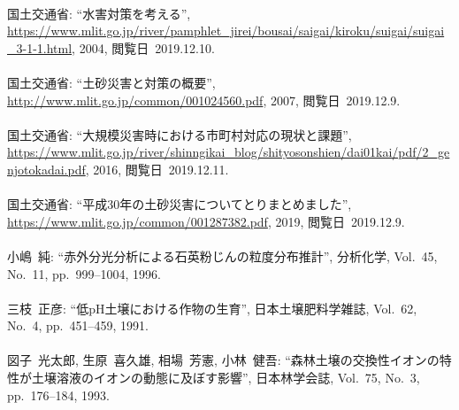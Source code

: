 \begin{mythebibliography}{}
\leavevmode \\国土交通省:
\newblock ``水害対策を考える'', 
\newblock \url{https://www.mlit.go.jp/river/pamphlet_jirei/bousai/saigai/kiroku/suigai/suigai_3-1-1.html}, 2004, 
\newblock \mbox{閲覧日 2019.12.10}.
\\

\leavevmode \\国土交通省:
\newblock ``土砂災害と対策の概要'', \\
\newblock \url{http://www.mlit.go.jp/common/001024560.pdf}, 2007, 
\newblock \mbox{閲覧日 2019.12.9}.
\\

\leavevmode \\国土交通省:
\newblock ``大規模災害時における市町村対応の現状と課題'', 
\newblock \url{https://www.mlit.go.jp/river/shinngikai_blog/shityosonshien/dai01kai/pdf/2_genjotokadai.pdf}, 2016, 
\newblock \mbox{閲覧日 2019.12.11}.
\\

\leavevmode \\国土交通省:
\newblock ``平成30年の土砂災害についてとりまとめました'', \\
\newblock \url{https://www.mlit.go.jp/common/001287382.pdf}, 2019, 
\newblock \mbox{閲覧日 2019.12.9}.
\\

\leavevmode \\小嶋~純:
\newblock ``赤外分光分析による石英粉じんの粒度分布推計'',
\newblock 分析化学, Vol.~45, No.~11, pp.~999--1004, 1996.
\\

\leavevmode \\三枝~正彦:
\newblock ``低pH土壌における作物の生育'',
\newblock 日本土壌肥料学雑誌, Vol.~62, No.~4, pp.~451--459, 1991.
\\

\leavevmode \\図子~光太郎,  生原~喜久雄, 相場~芳憲, 小林~健吾:
\newblock ``森林土壌の交換性イオンの特性が土壌溶液のイオンの動態に及ぼす影響'',
\newblock 日本林学会誌, Vol.~75, No.~3, pp.~176--184, 1993.
\\


\end{mythebibliography}
